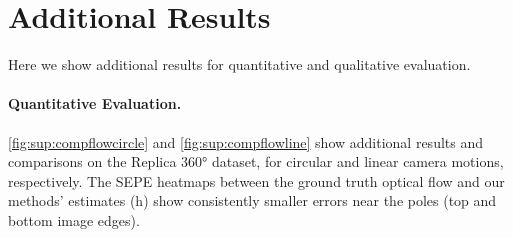\documentclass{bmvc2k}
\begin{document}
\section{Additional Results}

Here we show additional results for quantitative and qualitative evaluation.


\paragraph{Quantitative Evaluation.}

\cref{fig:sup:compflowcircle} and \cref{fig:sup:compflowline} show additional results and comparisons on the Replica 360° dataset, for circular and linear camera motions, respectively.
The SEPE heatmaps between the ground truth optical flow and our methods' estimates (h) show consistently smaller errors near the poles (top and bottom image edges).
\end{document}
